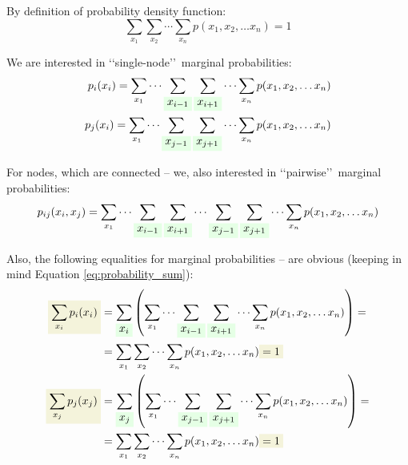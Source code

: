 \documentclass[fleqn,leqno]{article}
\newcommand{\highlight}[1]{\colorbox{green!10}{$\displaystyle#1$}}
\newcommand{\highlightred}[1]{\colorbox{olive!10}{$\displaystyle#1$}}
\begin{document}
By definition of probability density function:
\begin{equation} \label{eq:probability_sum}
\sum_{x_1} \sum_{x_2} \cdots \sum_{x_n}  p(x_1, x_2, \dots x_n) = 1
\end{equation}

We are interested in \lq \lq single-node\rq \rq\ marginal probabilities:
\begin{equation} \label{eq:marginal_probabilities_one_node}
\begin{split}
p_i(x_i) = \sum_{x_1} \cdots \sum_{ \highlight{ x_{i - 1} } } \sum_{ \highlight{ x_{i + 1} } } \cdots \sum_{x_n} p(x_1, x_2, \dots x_n) \\
p_j(x_i) = \sum_{x_1} \cdots \sum_{ \highlight{ x_{j - 1} } } \sum_{ \highlight{ x_{j + 1} } } \cdots \sum_{x_n} p(x_1, x_2, \dots x_n) \\
\end{split}
\end{equation}

For nodes, which are connected -- we, also interested in \lq \lq pairwise\rq \rq\ marginal probabilities:
\begin{equation} \label{eq:marginal_probabilities_two_nodes}
\begin{split}
p_{ij}(x_i, x_j) = \sum_{x_1} \cdots \sum_{ \highlight{ x_{i - 1} } } \sum_{ \highlight{ x_{i + 1} } } \cdots \sum_{ \highlight{ x_{j - 1} } } \sum_{ \highlight{ x_{j + 1} } } \cdots \sum_{x_n} p(x_1, x_2, \dots x_n)
\end{split}
\end{equation}

Also, the following equalities for marginal probabilities -- are obvious (keeping in mind Equation \eqref{eq:probability_sum}):
\begin{equation} \label{eq:sum_over_states_of_one_node_marginal_probabilities}
\begin{split}
\highlightred{ \sum_{x_i} p_i(x_i) } & =  \sum_{ \highlight{ x_i } } \left( \sum_{x_1} \cdots \sum_{ \highlight{ x_{i - 1} } } \sum_{ \highlight{ x_{i + 1} } } \cdots \sum_{x_n} p(x_1, x_2, \dots x_n) \right) = \\
                               & = \sum_{x_1} \sum_{x_2} \cdots \sum_{x_n}  p(x_1, x_2, \dots x_n) \highlightred{ = 1 } \\
\highlightred{ \sum_{x_j} p_j(x_j) } & = \sum_{ \highlight{ x_j } } \left( \sum_{x_1} \cdots \sum_{ \highlight{ x_{j - 1} } } \sum_{ \highlight{ x_{j + 1} } } \cdots \sum_{x_n} p(x_1, x_2, \dots x_n) \right) = \\
                               & = \sum_{x_1} \sum_{x_2} \cdots \sum_{x_n}  p(x_1, x_2, \dots x_n) \highlightred{ = 1 }
\end{split}
\end{equation}
\end{document}
